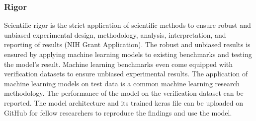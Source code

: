 \subsubsection{Rigor}

Scientific rigor is the strict application of scientific methods to ensure robust and unbiased experimental design, methodology, analysis, interpretation, and reporting of results (NIH Grant Application).  The robust and unbiased results is ensured by applying machine learning models to existing benchmarks and testing the model's result.  Machine learning benchmarks even come equipped with verification datasets to ensure unbiased experimental results.  The application of machine learning models on test data is a common machine learning research methodology.  The performance of the model on the verification dataset can be reported.  The model architecture and its trained keras file can be uploaded on GitHub for fellow researchers to reproduce the findings and use the model.  

